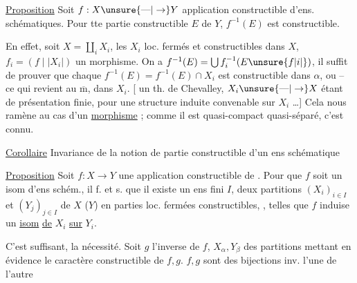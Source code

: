 
\uline{Proposition} Soit $f:X\unsure{\text{---}|\to}Y$  application constructible d'ens. schématiques. Pour tte partie constructible $E$ de $Y$, $f^{-1}(E)$ est constructible.


En effet, soit $X=\coprod_i X_i$, les $X_i$ loc. fermés et constructibles dans $X$,  $f_i=(f\mid |X_i|)$ un morphisme. On a $f^{-1}(E)=\bigcup f_i^{-1}(E\unsure{f|i|{}})$, il suffit de prouver que chaque $f^{-1}(E)=f^{-1}(E)\cap X_i$ est constructible dans $\alpha$, ou -- ce qui revient au $\overline{\mathrm m}$, dans $X_i$. [  un th. de Chevalley,  $X_i\unsure{\text{---}|\to}X$ étant de présentation finie, pour une structure induite convenable sur $X_i$ \ldots] Cela nous ramène au cas d'un \uline{morphisme}  ; comme il est quasi-compact quasi-séparé, c'est connu.


\uline{Corollaire} Invariance de la notion de partie constructible d'un ens schématique

\uline{Proposition} Soit $f:X\longrightarrow Y$ une application constructible de . Pour que $f$ soit un isom d'ens schém., il f. et s. que il existe  un  ens fini $I$, deux partitions $(X_i)_{i\in I}$ et $(Y_j)_{j\in I}$ de $X$ ($Y$) en parties loc. fermées constructibles, , telles que $f$ induise un \uline{isom} \uline{de} $X_i$ \uline{sur} $Y_i$.

C'est  suffisant,  la nécessité. Soit $g$ l'inverse de $f$, $X_\alpha,Y_\beta$ des partitions  mettant en évidence le caractère constructible de $f,g$.  $f,g$ sont des bijections inv. l'une de l'autre

